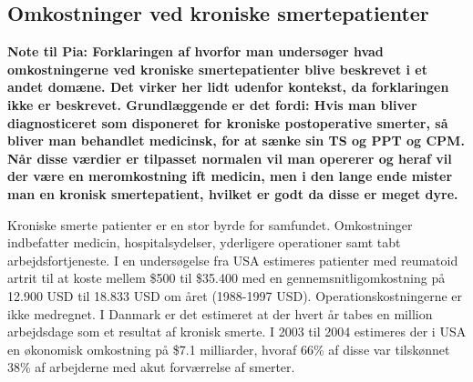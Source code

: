 \subsection{Omkostninger ved kroniske smertepatienter}
\textbf{Note til Pia: Forklaringen af hvorfor man undersøger hvad omkostningerne ved kroniske smertepatienter blive beskrevet i et andet domæne. Det virker her lidt udenfor kontekst, da forklaringen ikke er beskrevet. Grundlæggende er det fordi: Hvis man bliver diagnosticeret som disponeret for kroniske postoperative smerter, så bliver man behandlet medicinsk, for at sænke sin TS og PPT og CPM. Når disse værdier er tilpasset normalen vil man opererer og heraf vil der være en meromkostning ift medicin, men i den lange ende mister man en kronisk smertepatient, hvilket er godt da disse er meget dyre.}

Kroniske smerte patienter er en stor byrde for samfundet. Omkostninger indbefatter medicin, hospitalsydelser, yderligere operationer samt tabt arbejdsfortjeneste. I en undersøgelse fra USA estimeres patienter med reumatoid artrit til at koste mellem \$500 til \$35.400 med en gennemsnitligomkostning på 12.900 USD til 18.833 USD om året (1988-1997 USD). Operationskostningerne er ikke medregnet. \citep{Turk2002} I Danmark er det estimeret at der hvert år tabes en million arbejdsdage som et resultat af kronisk smerte. \citep{Eriksen2006} I 2003 til 2004 estimeres der i USA en økonomisk omkostning på \$7.1 milliarder, hvoraf 66\% af disse var tilskønnet 38\% af arbejderne med akut forværrelse af smerter. \citep{Phillips2009} %

